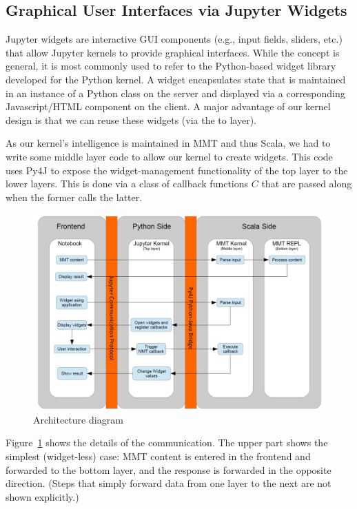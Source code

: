 
\subsection{Graphical User Interfaces via Jupyter Widgets}\label{sec:kernel:widgets}


Jupyter widgets are interactive GUI components (e.g., input fields, sliders, etc.) that allow Jupyter kernels to provide graphical interfaces.
While the concept is general, it is most commonly used to refer to the Python-based widget library developed for the Python kernel.
A widget encapsulates state that is maintained in an instance of a Python class on the server and displayed via a corresponding Javascript/HTML component on the client.
A major advantage of our kernel design is that we can reuse these widgets (via the to layer).

As our kernel's intelligence is maintained in MMT and thus Scala, we had to write some middle layer code to allow our kernel to create widgets.
This code uses Py4J to expose the widget-management functionality of the top layer to the lower layers.
This is done via a class of callback functions $C$ that are passed along when the former calls the latter.

\begin{figure}[ht]\centering
  \includegraphics[width=12cm]{../D4.11/ArchitectureDiagram}
  \caption{Architecture diagram}\label{fig:architecture-diagram}
\end{figure}

Figure~\ref{fig:architecture-diagram} shows the details of the communication.
The upper part shows the simplest (widget-less) case: MMT content is entered in the frontend and forwarded to the bottom layer, and the response is forwarded in the opposite direction. (Steps that simply forward data from one layer to the next are not shown explicitly.)

